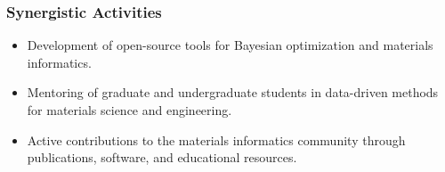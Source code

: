 \subsubsection*{Synergistic Activities}

\begin{itemize}[nosep]
    \item Development of open-source tools for Bayesian optimization and
        materials informatics.
    \item Mentoring of graduate and undergraduate students in data-driven
        methods for materials science and engineering.
    \item Active contributions to the materials informatics community through
        publications, software, and educational resources.
\end{itemize}

